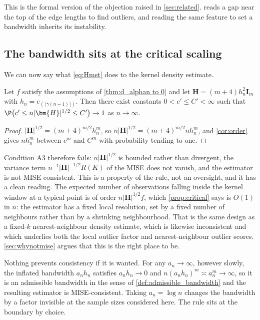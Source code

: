 This is the formal version of the objection raised in \cref{sec:related}. \citet{Rohlf1975} reads a gap near the top of the edge lengths to find outliers, and reading the same feature to set a bandwidth inherits its instability.

\subsection{The bandwidth sits at the critical scaling}\label{sec:critical}

We can now say what \eqref{eq:Hmst} does to the kernel density estimate.

\begin{proposition}\label{prop:critical}
  Let $f$ satisfy the assumptions of \cref{thm:d_alphan to 0} and let $\bm{H}=(m+4)h_n^2\bm{I}_m$ with $h_n=e_{(\lceil\gamma(n-1)\rceil)}$. Then there exist constants $0<c'\leq C'<\infty$ such that $\P\big(c'\leq n|\bm{H}|^{1/2}\leq C'\big)\to1$ as $n\to\infty$.
\end{proposition}

\begin{proof}
  $|\bm{H}|^{1/2}=(m+4)^{m/2}h_n^m$, so $n|\bm{H}|^{1/2}=(m+4)^{m/2}nh_n^m$, and \cref{cor:order} gives $nh_n^m$ between $c^m$ and $C^m$ with probability tending to one.
\end{proof}

Condition A3 therefore fails: $n|\bm{H}|^{1/2}$ is bounded rather than divergent, the variance term $n^{-1}|\bm{H}|^{-1/2}R(K)$ of the MISE does not vanish, and the estimator is not MISE-consistent. This is a property of the rule, not an oversight, and it has a clean reading. The expected number of observations falling inside the kernel window at a typical point is of order $n|\bm{H}|^{1/2}f$, which \cref{prop:critical} says is $O(1)$ in $n$: the estimator has a fixed local resolution, set by a fixed number of neighbours rather than by a shrinking neighbourhood. That is the same design as a fixed-$k$ nearest-neighbour density estimate, which is likewise inconsistent and which underlies both the local outlier factor \citep{breunig2000lof} and nearest-neighbour outlier scores. \cref{sec:whynotmise} argues that this is the right place to be.

\begin{remark}\label{rem:inflate}
  Nothing prevents consistency if it is wanted. For any $a_n\to\infty$, however slowly, the inflated bandwidth $a_nh_n$ satisfies $a_nh_n\to0$ and $n(a_nh_n)^m\asymp a_n^m\to\infty$, so it is an admissible bandwidth in the sense of \cref{def:admissible_bandwidth} and the resulting estimator is MISE-consistent. Taking $a_n=\log n$ changes the bandwidth by a factor invisible at the sample sizes considered here. The rule sits at the boundary by choice.
\end{remark}

